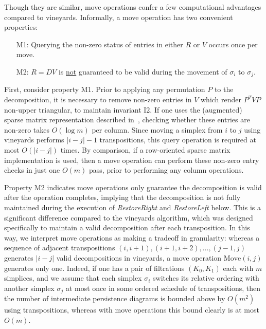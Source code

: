 \documentclass{siamart190516}
\begin{document}
Though they are similar, move operations confer a few computational advantages compared to vineyards. Informally, a move operation has two convenient properties:
\\	
 \begin{enumerate}[leftmargin=2\parindent, align=left, labelsep=-5pt, topsep=0pt,itemsep=-0.25ex,parsep=1.2ex]
 	\item[M1:] Querying the non-zero status of entries in either $R$ or $V$ occurs once per move.
 	\item[M2:] $R = D V$ is \underline{not} guaranteed to be valid  during the movement of $\sigma_i $ to $ \sigma_j$.
 \end{enumerate} 
 \vspace*{1em}
First, consider property M1. Prior to applying any permutation $P$ to the decomposition, it is necessary to remove non-zero entries in $V$ which render $P^TVP$ non-upper triangular, to maintain invariant I2. 
If one uses the (augmented) sparse matrix representation described in~\cite{cohen2006vines}, checking whether these entries are non-zero takes $O(\log m)$ per column. Since moving a simplex from $i$ to $j$ using vineyards performs $\lvert i - j \rvert - 1$ transpositions, this query operation is required at most $O(\lvert i - j \rvert)$ times.
By comparison, if a row-oriented sparse matrix implementation is used, then a move operation can perform these non-zero entry checks in just one $O(m)$ pass, prior to performing any column operations. 

Property M2 indicates move operations only guarantee the decomposition is valid after the operation completes, implying that the decomposition is not fully maintained during the execution of \textit{RestoreRight} and \textit{RestoreLeft} below. 
This is a significant difference compared to the vineyards algorithm, which was designed specifically to maintain a valid decomposition after each transposition. 
In this way, we interpret move operations as making a tradeoff in granularity: whereas a sequence of adjacent transpositions $(i, i{+}1), (i{+}1, i{+}2), \dots, (j{-}1, j)$ generates $\lvert i - j \rvert $ valid decompositions in vineyards, a move operation $\mathrm{Move}(i,j)$ generates only one.
Indeed, if one has a pair of filtrations $(K_0, K_1)$ each with $m$ simplices, and we assume that each simplex $\sigma_i$ switches its relative ordering with another simplex $\sigma_j$ at most once in some ordered schedule of transpositions, then the number of intermediate persistence diagrams is bounded above by $O(m^2)$ using transpositions, whereas with move operations this bound clearly is at most $O(m)$.  \\ 
\end{document}
